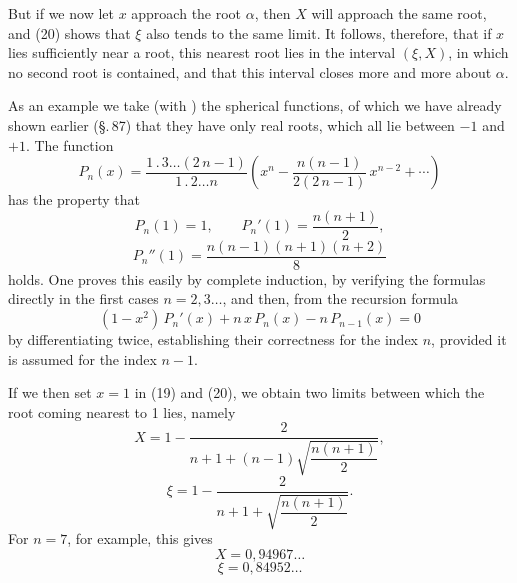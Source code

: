 
But if we now let $x$ approach the root $\alpha$, then $X$ will approach the same root, and (20) shows that $\xi$ also tends to the same limit. It follows, therefore, that if $x$ lies sufficiently near a root, this nearest root lies in the interval $(\xi, X)$, in which no second root is contained, and that this interval closes more and more about $\alpha$.

As an example we take (with ) the spherical functions, of which we have already shown earlier (\S.\,87) that they have only real roots, which all lie between $-1$ and $+1$. The function
\[
P_n(x) = \frac{1\,.\,3 \ldots (2\,n-1)}{1\,.\,2 \ldots n} \left( x^n - \frac{n(n-1)}{2(2\,n-1)}\,x^{n-2} + \cdots \right)
\]
has the property that
\[
P_n(1) = 1, \qquad P_n'(1) = \frac{n(n+1)}{2},
\]
\[
P_n''(1) = \frac{n(n-1)(n+1)(n+2)}{8}
\]
holds. One proves this easily by complete induction, by verifying the formulas directly in the first cases $n = 2, 3 \ldots$, and then, from the recursion formula
\[
(1 - x^2)\,P_n'(x) + n\,x\,P_n(x) - n\,P_{n-1}(x) = 0
\]
by differentiating twice, establishing their correctness for the index $n$, provided it is assumed for the index $n-1$.

If we then set $x = 1$ in (19) and (20), we obtain two limits between which the root coming nearest to 1 lies, namely
\[
X = 1 - \frac{2}{n + 1 + (n-1)\sqrt{\dfrac{n(n+1)}{2}}},
\]
\[
\xi = 1 - \frac{2}{n + 1 + \sqrt{\dfrac{n(n+1)}{2}}}.
\]
For $n = 7$, for example, this gives
\[
X = 0{,}94967 \ldots
\]
\[
\xi = 0{,}84952 \ldots
\]
